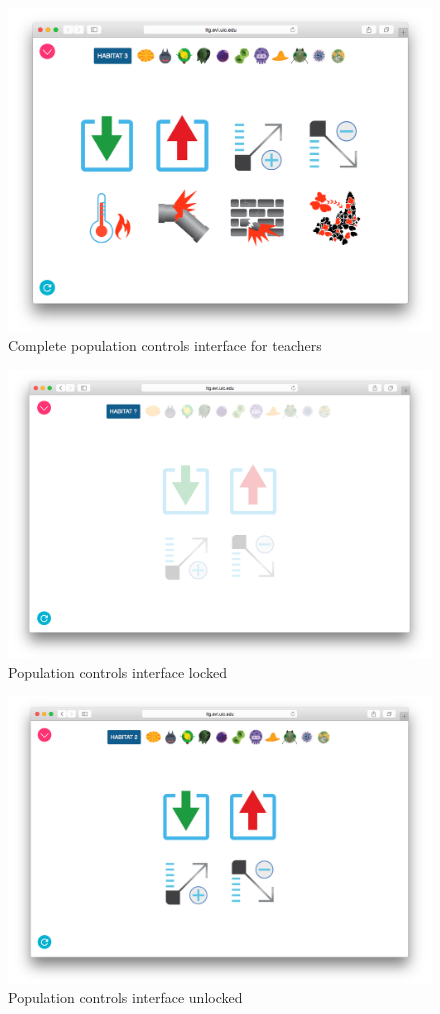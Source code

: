 \begin{figure}
\centering
\includegraphics[width=4.5in]{images/population-controls-teacher.png}
\caption{Complete population controls interface for teachers}
\label{fig:population_controls_teachers}
\end{figure}

\begin{figure}
\centering
\includegraphics[width=4.5in]{images/population-controls-locked.png}
\caption{Population controls interface locked}
\label{fig:population_controls_locked}
\end{figure}

\begin{figure}
\centering
\includegraphics[width=4.5in]{images/population-controls-unlocked.png}
\caption{Population controls interface unlocked}
\label{fig:population_controls_unlocked}
\end{figure}

